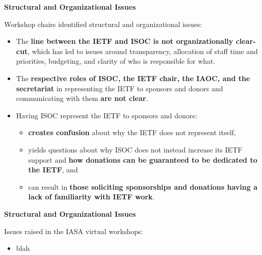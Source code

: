 \documentclass[helvetica]{seminar}
\newcommand{\heading}[1]{%
  \begin{center} 
    \large\bf 
    #1 
  \end{center} 
  \vspace{.4 in}}
\begin{document}
\begin{slide}
\heading{Structural and Organizational Issues}

Workshop chairs identified structural and organizational issues:
{\footnotesize
\begin{itemize}
\item The \textbf{line between the IETF and ISOC is not
  organizationally clear-cut}, which has led to issues around
  transparency, allocation of staff time and priorities, budgeting,
  and clarity of who is responsible for what.
\item The \textbf{respective roles of ISOC, the IETF chair, the IAOC,
  and the secretariat} in representing the IETF to sponsors and donors
  and communicating with them \textbf{are not clear}.
\item Having ISOC represent the IETF to sponsors and donors:
  \begin{itemize}
  \item \textbf{creates confusion} about why the IETF does not
    represent itself,
  \item yields questions about why ISOC does not instead increase its
    IETF support and \textbf{how donations can be guaranteed to be
      dedicated to the IETF}, and
  \item can result in \textbf{those soliciting sponsorships and
    donations having a lack of familiarity with IETF work}.
  \end{itemize}
\end{itemize}
}

\end{slide}

\begin{slide}
\heading{Structural and Organizational Issues}

Issues raised in the IASA virtual workshops:
\begin{itemize}
\item blah
\end{itemize}

\end{slide}
\end{document}
